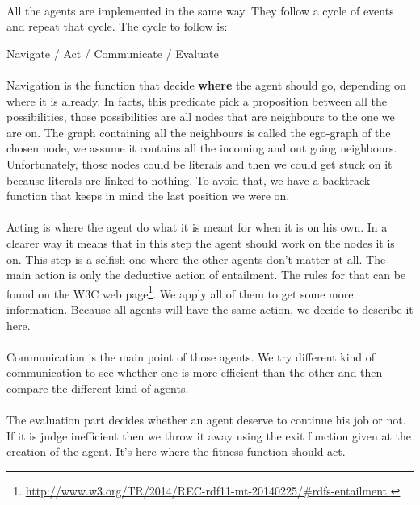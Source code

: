 \documentclass{article}
\begin{document}
		\paragraph{}
			All the agents are implemented in the same way.
			They follow a cycle of events and repeat that cycle.
			The cycle to follow is:
		\begin{center}
			Navigate / Act / Communicate / Evaluate
		\end{center}
		\paragraph{}
			Navigation is the function that decide \textbf{where} the agent should go, depending on where it is already.
			In facts, this predicate pick a proposition between all the possibilities,
			those possibilities are all nodes that are neighbours to the one we are on.
			The graph containing all the neighbours is called the ego-graph of the chosen node,
			we assume it contains all the incoming and out going neighbours.
			Unfortunately, those nodes could be literals and then we could get stuck on it because literals are linked to nothing.
			To avoid that, we have a backtrack function that keeps in mind the last position we were on.
		\paragraph{}
			Acting is where the agent do what it is meant for when it is on his own.
			In a clearer way it means that in this step the agent should work on the nodes it is on.
			This step is a selfish one where the other agents don't matter at all.
			The main action is only the deductive action of entailment.
			The rules for that can be found on the W3C web page\footnote{
				\url{http://www.w3.org/TR/2014/REC-rdf11-mt-20140225/\#rdfs-entailment
			}}.
			We apply all of them to get some more information.
			Because all agents will have the same action, we decide to describe it here.
		\paragraph{}
			Communication is the main point of those agents.
			We try different kind of communication to see whether one is more efficient than the other
			and then compare the different kind of agents.
		\paragraph{}
			The evaluation part decides whether an agent deserve to continue his job or not.
			If it is judge inefficient then we throw it away using the exit function given at the creation of the agent.
			It's here where the fitness function should act.
\end{document}
